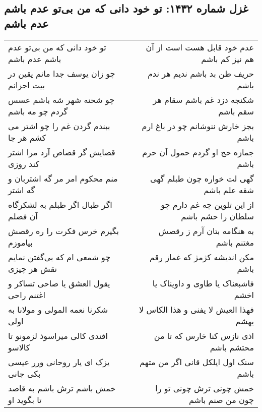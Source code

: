 \begin{center}
\section*{غزل شماره ۱۴۳۲: تو خود دانی که من بی‌تو عدم باشم عدم باشم}
\label{sec:1432}
\begin{longtable}{l p{0.5cm} r}
تو خود دانی که من بی‌تو عدم باشم عدم باشم
&&
عدم خود قابل هست است از آن هم نیز کم باشم
\\
چو زان یوسف جدا مانم یقین در بیت احزانم
&&
حریف ظن بد باشم ندیم هر ندم باشم
\\
چو شحنه شهر شه باشم عسس گردم چو مه باشم
&&
شکنجه دزد غم باشم سقام هر سقم باشم
\\
ببندم گردن غم را چو اشتر می کشم هر جا
&&
بجز خارش ننوشانم چو در باغ ارم باشم
\\
قضایش گر قصاص آرد مرا اشتر کند روزی
&&
جمازه حج او گردم حمول آن حرم باشم
\\
منم محکوم امر مر گه اشتربان و گه اشتر
&&
گهی لت خواره چون طبلم گهی شقه علم باشم
\\
اگر طبال اگر طبلم به لشکرگاه آن فضلم
&&
از این تلوین چه غم دارم چو سلطان را حشم باشم
\\
بگیرم خرس فکرت را ره رقصش بیاموزم
&&
به هنگامه بتان آرم ز رقصش مغتنم باشم
\\
چو شمعی ام که بی‌گفتن نمایم نقش هر چیزی
&&
مکن اندیشه کژمژ که غماز رقم باشم
\\
یقول العشق یا صاحی تساکر و اغتنم راحی
&&
فاشبعناک یا طاوی و داویناک یا اخشم
\\
شکرنا نعمه المولی و مولانا به اولی
&&
فهذا العیش لا یفنی و هذا الکاس لا یهشم
\\
افندی کالی میراسوذ لزمونو تا کالاسو
&&
اذی نازس کنا خارس که تا من محتشم باشم
\\
یزک ای یار روحانی ورر عیسی بکی جانی
&&
سنک اول ایلکل قانی اگر من متهم باشم
\\
خمش باشم ترش باشم به قاصد تا بگوید او
&&
خمش چونی ترش چونی تو را چون من صنم باشم
\\
\end{longtable}
\end{center}
